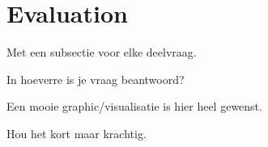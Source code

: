 \section{Evaluation}
\label{sec:eva}

Met een subsectie voor elke deelvraag.

In hoeverre is je vraag beantwoord?

Een mooie graphic/visualisatie is hier heel gewenst.

Hou het kort maar krachtig.
